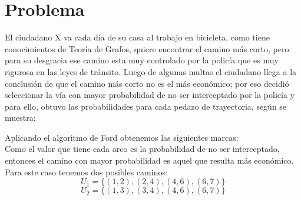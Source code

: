 \documentclass[autocontact]{gaceta}
\begin{document}
\section{Problema}
        El ciudadano X va cada día de su casa al trabajo en bicicleta, como tiene conocimientos
        de Teoría de Grafos, quiere encontrar el camino más corto, pero para su desgracia ese 
        camino esta muy controlado por la policía que es muy rigurosa en las leyes de tránsito.
        Luego de algunas multas el ciudadano llega a la conclusión de que el camino más corto no
        es el más económico; por eso decidió seleccionar la vía con mayor probabilidad de no ser 
        interceptado por la policía y para ello, obtuvo las probabilidades para  cada pedazo de
        trayectoria, según se muestra:
        
        
        
        Aplicando el algoritmo de Ford obtenemos las siguientes marcas:\\
        
        Como el valor que tiene cada arco es la probabilidad de no ser interceptado, entonces el 
        camino con mayor probabilidad es aquel que resulta más económico. Para este caso 
        tenemos dos posibles caminos:
        \begin{equation}
            U_1 = \{(1,2), (2,4), (4,6), (6,7)\}
        \end{equation}
        \begin{equation}
            U_2 = \{(1,3), (3,4), (4,6), (6,7) \}
        \end{equation}

\end{document}
